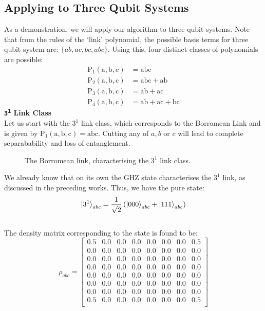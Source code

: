 \documentclass{scrartcl}
\begin{document}
\subsection{Applying to Three Qubit Systems}
As a demonstration, we will apply our algorithm to three qubit systems. Note that from the rules of the `link' polynomial, the possible basis terms for three qubit system are: $\{ab,ac,bc, abc\}$. Using this, four distinct classes of polynomials are possible:
\begin{align*}
    \mathrm{P_1(a,b,c)} &=\mathrm{abc} \\
   \mathrm{P_2(a,b,c)} &=\mathrm{ abc+ab} \\
   \mathrm{P_3(a,b,c)} &=\mathrm{ ab+ac} \\
   \mathrm{P_4(a,b,c)} &=\mathrm{ ab+ac+bc}
\end{align*}
\textbf{\large \texttt{3\textsuperscript{1}} Link Class} \\[0.3cm]
Let us start with the $3^1$ link class, which corresponds to the Borromean Link and is given by $\mathrm{P_1(a,b,c)= abc}$. Cutting any of $a,b$ or $c$ will lead to complete separabability and loss of entanglement. 
\begin{figure}[H]
    \centering
    
  \caption{The Borromean link, characterising the $3^1$ link class.}
\end{figure}
\noindent
We already know that on its own the GHZ state characterises the $3^1$ link, as discussed in the preceding works. Thus, we have the pure state:
$$\ket{3^1}_{abc} = \frac{1}{\sqrt{2}}\left( \ket{000}_{abc}+\ket{111}_{abc} \right)$$\\[0.3cm]
The density matrix corresponding to the state is found to be:
\begin{equation*}
    \rho_{abc} =
    \left[
    \begin{array}{cccccccc}
    0.5 & 0.0 & 0.0 & 0.0 & 0.0 & 0.0 & 0.0 & 0.5 \\
    0.0 & 0.0 & 0.0 & 0.0 & 0.0 & 0.0 & 0.0 & 0.0 \\
    0.0 & 0.0 & 0.0 & 0.0 & 0.0 & 0.0 & 0.0 & 0.0 \\
    0.0 & 0.0 & 0.0 & 0.0 & 0.0 & 0.0 & 0.0 & 0.0 \\
    0.0 & 0.0 & 0.0 & 0.0 & 0.0 & 0.0 & 0.0 & 0.0 \\
    0.0 & 0.0 & 0.0 & 0.0 & 0.0 & 0.0 & 0.0 & 0.0 \\
    0.0 & 0.0 & 0.0 & 0.0 & 0.0 & 0.0 & 0.0 & 0.0 \\
    0.5 & 0.0 & 0.0 & 0.0 & 0.0 & 0.0 & 0.0 & 0.5 \\
    \end{array}
    \right]
    \end{equation*}
\end{document}
